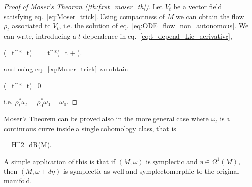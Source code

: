 \documentclass[main.tex]{subfiles}
\begin{document}
\begin{proof}[Proof of Moser's Theorem (\ref{th:first_moser_th})]
	Let $V_t$ be a vector field satisfying eq.~\eqref{eq:Moser_trick}. Using compactness of $M$ we can obtain the flow $\rho_t$ associated to $V_t$, i.e. the solution of eq.~\eqref{eq:ODE_flow_non_autonomous}. We can write, introducing a $t$-dependence in eq.~\eqref{eq:t_depend_Lie_derivative}, 
	\begin{eqalign}
	\label{eq:der_of_flowing_symp}
		(\rho_t^*\omega_t) = \rho_t^*\left(\omega_t + \right).
	\end{eqalign}
	and using eq.~\eqref{eq:Moser_trick} we obtain
	\begin{eqalign}
		(\rho_t^*\omega_t)=0
	\end{eqalign}
	i.e. $\rho_t^*\omega_t = \rho_0^*\omega_0 = \omega_0$. 
\end{proof}

\begin{remark}
	Moser's Theorem can be proved also in the more general case where $\omega_t$ is a continuous curve inside a single cohomology class, that is
	\begin{eqalign}
		  =  \in H^2_{dR}(M).
	\end{eqalign}
	A simple application of this is that if $(M, \omega)$ is symplectic and $\eta \in \Omega^1(M)$, then $(M, \omega + d\eta)$ is symplectic as well and symplectomorphic to the original manifold.
\end{remark}
\end{document}
